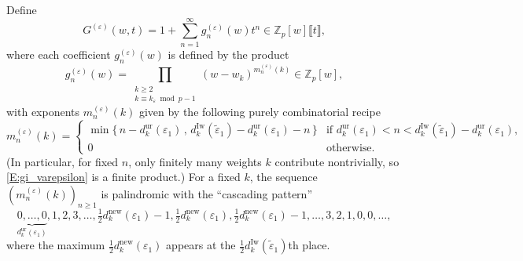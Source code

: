 \begin{definition}
    \label{D:ghost_series}
    Define
    $$
    G^{(\varepsilon)}(w,t)= 1+\sum_{n=1}^\infty g_n^{(\varepsilon)}(w)t^n\in {\mathbb{Z}}_p[w]\llbracket t\rrbracket,
    $$
    where each coefficient $g_n^{(\varepsilon)}(w)$ is defined by the product
    \begin{equation}\label{E:gi_varepsilon}
    g_n^{(\varepsilon)}(w) = \prod_{\substack{k \geq 2\\ k \equiv k_\varepsilon \bmod{p-1}}} (w - w_k)^{m_n^{(\varepsilon)}(k)} \in {\mathbb{Z}}_p[w],
    \end{equation}
    with exponents $m_n^{(\varepsilon)}(k)$ given by the following purely combinatorial recipe
    \[
    m_n^{(\varepsilon)}(k) =
    \begin{cases}
    \min\big\{\, n - d_{k}^{\mathrm{ur}}( \varepsilon_1) \,,\, d_{k}^{\mathrm{Iw}}(\tilde \varepsilon_1)- d_{k}^{\mathrm{ur}}(\varepsilon_1) - n \,\big\}
    & \textrm{if } d_{k}^{\mathrm{ur}}(\varepsilon_1) < n < d_{k}^{\mathrm{Iw}}(\tilde\varepsilon_1) - d_{k}^{\mathrm{ur}}(\varepsilon_1),\\
    0 & \textrm{otherwise.}
    \end{cases}
    \]
    (In particular, for fixed $n$, only finitely many weights $k$ contribute nontrivially, so \eqref{E:gi_varepsilon} is a finite product.)
    For a fixed $k$, the sequence $(m_n^{(\varepsilon)}(k))_{n \geq 1}$ is palindromic with the ``cascading pattern''
    \begin{equation}\label{E:cascading_pattern}
    \underbrace{0, \dots, 0}_{d_{k}^{{\mathrm{ur}}}(\varepsilon_1)}, 1, 2, 3, \dots, \tfrac12 d_{k}^{\mathrm{new}}(\varepsilon_1) -1, \tfrac12{d_{k}^{\mathrm{new}}(\varepsilon_1)}, \tfrac12{d_{k}^{\mathrm{new}}(\varepsilon_1)} -1,\dots,  3, 2, 1, 0, 0, \dots,
    \end{equation}
    where the maximum $\frac 12 d_{k}^{{\mathrm{new}}}(\varepsilon_1)$ appears at the $\frac 12 d_{k}^{{\mathrm{Iw}}}(\tilde\varepsilon_1)$th place.
\end{definition}

